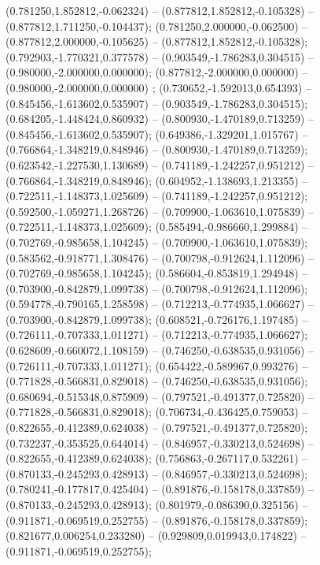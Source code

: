  (0.781250,1.852812,-0.062324) -- (0.877812,1.852812,-0.105328) -- (0.877812,1.711250,-0.104437);
 (0.781250,2.000000,-0.062500) -- (0.877812,2.000000,-0.105625) -- (0.877812,1.852812,-0.105328);
 (0.792903,-1.770321,0.377578) -- (0.903549,-1.786283,0.304515) -- (0.980000,-2.000000,0.000000);
 (0.877812,-2.000000,0.000000) -- (0.980000,-2.000000,0.000000) ;
 (0.730652,-1.592013,0.654393) -- (0.845456,-1.613602,0.535907) -- (0.903549,-1.786283,0.304515);
 (0.684205,-1.448424,0.860932) -- (0.800930,-1.470189,0.713259) -- (0.845456,-1.613602,0.535907);
 (0.649386,-1.329201,1.015767) -- (0.766864,-1.348219,0.848946) -- (0.800930,-1.470189,0.713259);
 (0.623542,-1.227530,1.130689) -- (0.741189,-1.242257,0.951212) -- (0.766864,-1.348219,0.848946);
 (0.604952,-1.138693,1.213355) -- (0.722511,-1.148373,1.025609) -- (0.741189,-1.242257,0.951212);
 (0.592500,-1.059271,1.268726) -- (0.709900,-1.063610,1.075839) -- (0.722511,-1.148373,1.025609);
 (0.585494,-0.986660,1.299884) -- (0.702769,-0.985658,1.104245) -- (0.709900,-1.063610,1.075839);
 (0.583562,-0.918771,1.308476) -- (0.700798,-0.912624,1.112096) -- (0.702769,-0.985658,1.104245);
 (0.586604,-0.853819,1.294948) -- (0.703900,-0.842879,1.099738) -- (0.700798,-0.912624,1.112096);
 (0.594778,-0.790165,1.258598) -- (0.712213,-0.774935,1.066627) -- (0.703900,-0.842879,1.099738);
 (0.608521,-0.726176,1.197485) -- (0.726111,-0.707333,1.011271) -- (0.712213,-0.774935,1.066627);
 (0.628609,-0.660072,1.108159) -- (0.746250,-0.638535,0.931056) -- (0.726111,-0.707333,1.011271);
 (0.654422,-0.589967,0.993276) -- (0.771828,-0.566831,0.829018) -- (0.746250,-0.638535,0.931056);
 (0.680694,-0.515348,0.875909) -- (0.797521,-0.491377,0.725820) -- (0.771828,-0.566831,0.829018);
 (0.706734,-0.436425,0.759053) -- (0.822655,-0.412389,0.624038) -- (0.797521,-0.491377,0.725820);
 (0.732237,-0.353525,0.644014) -- (0.846957,-0.330213,0.524698) -- (0.822655,-0.412389,0.624038);
 (0.756863,-0.267117,0.532261) -- (0.870133,-0.245293,0.428913) -- (0.846957,-0.330213,0.524698);
 (0.780241,-0.177817,0.425404) -- (0.891876,-0.158178,0.337859) -- (0.870133,-0.245293,0.428913);
 (0.801979,-0.086390,0.325156) -- (0.911871,-0.069519,0.252755) -- (0.891876,-0.158178,0.337859);
 (0.821677,0.006254,0.233280) -- (0.929809,0.019943,0.174822) -- (0.911871,-0.069519,0.252755);
